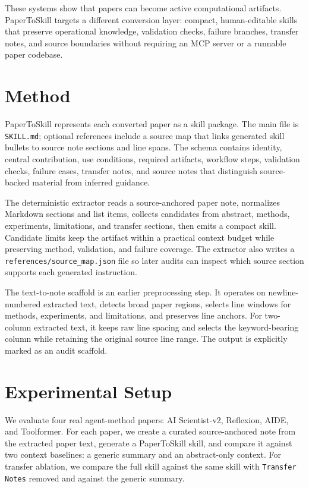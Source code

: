 \documentclass[letterpaper]{article}
\begin{document}
These systems show that papers can become active computational artifacts.
PaperToSkill targets a different conversion layer: compact, human-editable
skills that preserve operational knowledge, validation checks, failure branches,
transfer notes, and source boundaries without requiring an MCP server or a
runnable paper codebase.

\section{Method}

PaperToSkill represents each converted paper as a skill package. The main file
is \texttt{SKILL.md}; optional references include a source map that links
generated skill bullets to source note sections and line spans. The schema
contains identity, central contribution, use conditions, required artifacts,
workflow steps, validation checks, failure cases, transfer notes, and source
notes that distinguish source-backed material from inferred guidance.

The deterministic extractor reads a source-anchored paper note, normalizes
Markdown sections and list items, collects candidates from abstract, methods,
experiments, limitations, and transfer sections, then emits a compact skill.
Candidate limits keep the artifact within a practical context budget while
preserving method, validation, and failure coverage. The extractor also writes a
\texttt{references/source\_map.json} file so later audits can inspect which
source section supports each generated instruction.

The text-to-note scaffold is an earlier preprocessing step. It operates on
newline-numbered extracted text, detects broad paper regions, selects line
windows for methods, experiments, and limitations, and preserves line anchors.
For two-column extracted text, it keeps raw line spacing and selects the
keyword-bearing column while retaining the original source line range. The
output is explicitly marked as an audit scaffold.

\section{Experimental Setup}

We evaluate four real agent-method papers: AI Scientist-v2, Reflexion, AIDE,
and Toolformer. For each paper, we create a curated source-anchored note from
the extracted paper text, generate a PaperToSkill skill, and compare it against
two context baselines: a generic summary and an abstract-only context. For
transfer ablation, we compare the full skill against the same skill with
\texttt{Transfer Notes} removed and against the generic summary.
\end{document}
